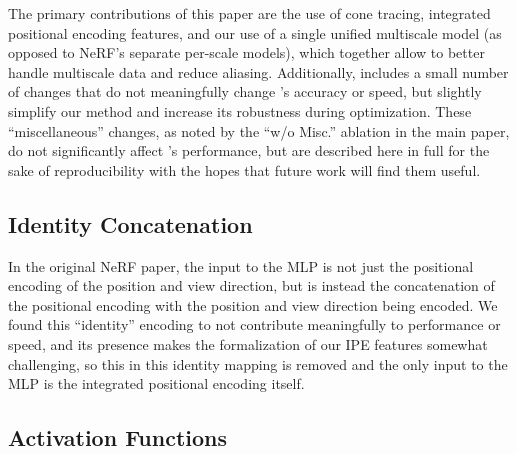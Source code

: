 \documentclass[10pt,twocolumn,letterpaper]{article}
\begin{document}
The primary contributions of this paper are the use of cone tracing, integrated positional encoding features, and our use of a single unified multiscale model (as opposed to NeRF's separate per-scale models), which together allow \shortmodelnamelower to better handle multiscale data and reduce aliasing. Additionally, \shortmodelnamelower includes a small number of changes that do not meaningfully change \shortmodelnamelower's accuracy or speed, but slightly simplify our method and increase its robustness during optimization. These ``miscellaneous'' changes, as noted by the ``w/o Misc.'' ablation in the main paper, do not significantly affect \shortmodelnamelower's performance, but are described here in full for the sake of reproducibility with the hopes that future work will find them useful.

\subsection{Identity Concatenation}

In the original NeRF paper, the input to the MLP is not just the positional encoding of the position and view direction, but is instead the concatenation of the positional encoding with the position and view direction being encoded. We found this ``identity'' encoding to not contribute meaningfully to performance or speed, and its presence makes the formalization of our IPE features somewhat challenging, so this in \shortmodelnamelower this identity mapping is removed and the only input to the MLP is the integrated positional encoding itself.

\subsection{Activation Functions}
\end{document}
